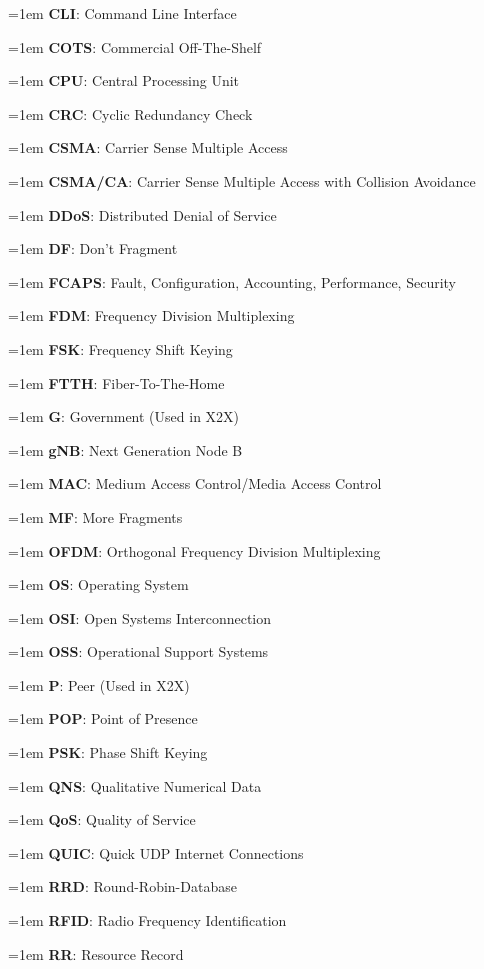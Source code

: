 \documentclass[letterpaper,8pt]{extarticle}
\newcommand{\definition}[2]{
  \hangindent=1em
  \textbf{#1}: #2%
}
\begin{document}
\begin{multicols*}{5}
\begin{multicols*}{2}
    \definition{CLI}{Command Line Interface}

    \definition{COTS}{Commercial Off-The-Shelf}

    \definition{CPU}{Central Processing Unit}

    \definition{CRC}{Cyclic Redundancy Check}

    \definition{CSMA}{Carrier Sense Multiple Access}

    \definition{CSMA/CA}{Carrier Sense Multiple Access with Collision Avoidance}

    \definition{DDoS}{Distributed Denial of Service}

    \definition{DF}{Don't Fragment}

    \definition{FCAPS}{Fault, Configuration, Accounting, Performance, Security}

    \definition{FDM}{Frequency Division Multiplexing}

    \definition{FSK}{Frequency Shift Keying}

    \definition{FTTH}{Fiber-To-The-Home}

    \definition{G}{Government (Used in X2X)}

    \definition{gNB}{Next Generation Node B}

    \definition{MAC}{Medium Access Control/Media Access Control}

    \definition{MF}{More Fragments}

    \definition{OFDM}{Orthogonal Frequency Division Multiplexing}

    \definition{OS}{Operating System}

    \definition{OSI}{Open Systems Interconnection}

    \definition{OSS}{Operational Support Systems}

    \definition{P}{Peer (Used in X2X)}

    \definition{POP}{Point of Presence}

    \definition{PSK}{Phase Shift Keying}

    \definition{QNS}{Qualitative Numerical Data}

    \definition{QoS}{Quality of Service}

    \definition{QUIC}{Quick UDP Internet Connections}

    \definition{RRD}{Round-Robin-Database}

    \definition{RFID}{Radio Frequency Identification}

    \definition{RR}{Resource Record}


\end{multicols*}
\end{multicols*}
\end{document}
